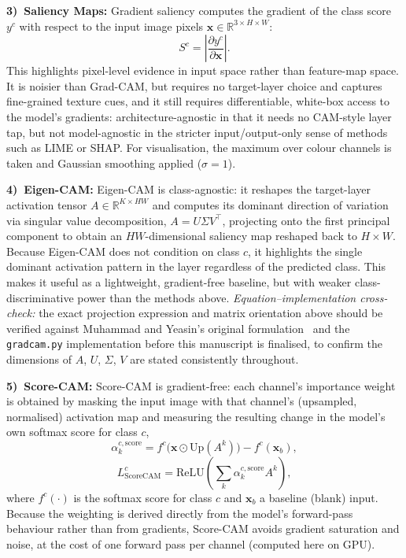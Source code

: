 \textbf{3)~Saliency Maps:} Gradient saliency \cite{ref33} computes the gradient of the class score $y^c$ with respect to the input image pixels $\mathbf{x} \in \mathbb{R}^{3 \times H \times W}$:
\begin{equation}
S^c = \left|\frac{\partial y^c}{\partial \mathbf{x}}\right|.
\end{equation}
This highlights pixel-level evidence in input space rather than feature-map space. It is noisier than Grad-CAM, but requires no target-layer choice and captures fine-grained texture cues, and it still requires differentiable, white-box access to the model's gradients: architecture-agnostic in that it needs no CAM-style layer tap, but not model-agnostic in the stricter input/output-only sense of methods such as LIME or SHAP. For visualisation, the maximum over colour channels is taken and Gaussian smoothing applied ($\sigma=1$).

\textbf{4)~Eigen-CAM:} Eigen-CAM \cite{ref34} is class-agnostic: it reshapes the target-layer activation tensor $A \in \mathbb{R}^{K \times HW}$ and computes its dominant direction of variation via singular value decomposition, $A = U\Sigma V^{\!\top}$, projecting onto the first principal component to obtain an $HW$-dimensional saliency map reshaped back to $H \times W$. Because Eigen-CAM does not condition on class $c$, it highlights the single dominant activation pattern in the layer regardless of the predicted class. This makes it useful as a lightweight, gradient-free baseline, but with weaker class-discriminative power than the methods above. \textit{Equation--implementation cross-check:} the exact projection expression and matrix orientation above should be verified against Muhammad and Yeasin's original formulation~\cite{ref34} and the \texttt{gradcam.py} implementation before this manuscript is finalised, to confirm the dimensions of $A$, $U$, $\Sigma$, $V$ are stated consistently throughout.

\textbf{5)~Score-CAM:} Score-CAM \cite{ref35} is gradient-free: each channel's importance weight is obtained by masking the input image with that channel's (upsampled, normalised) activation map and measuring the resulting change in the model's own softmax score for class $c$,
\begin{equation}
\alpha_k^{c,\text{score}} = f^c\big(\mathbf{x}\odot \text{Up}(A^k)\big) - f^c(\mathbf{x}_b),
\end{equation}
\begin{equation}
L^c_{\text{ScoreCAM}} = \mathrm{ReLU}\!\left(\sum_k \alpha_k^{c,\text{score}} A^k\right),
\end{equation}
where $f^c(\cdot)$ is the softmax score for class $c$ and $\mathbf{x}_b$ a baseline (blank) input. Because the weighting is derived directly from the model's forward-pass behaviour rather than from gradients, Score-CAM avoids gradient saturation and noise, at the cost of one forward pass per channel (computed here on GPU).

